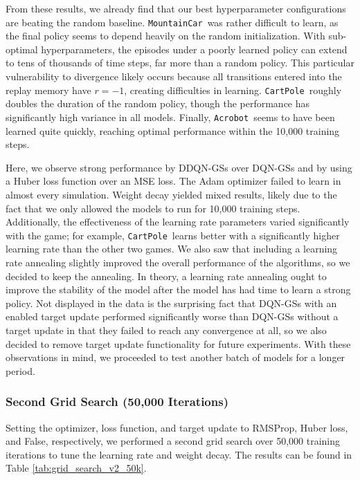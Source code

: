 \documentclass[11pt]{article}
\newcommand{\cp}{\texttt{CartPole}}
\newcommand{\ab}{\texttt{Acrobot}}
\newcommand{\mc}{\texttt{MountainCar}}
\begin{document}
From these results, we already find that our best hyperparameter configurations are beating the random baseline. \mc~was rather difficult to learn, as the final policy seems to depend heavily on the random initialization. With sub-optimal hyperparameters, the episodes under a poorly learned policy can extend to tens of thousands of time steps, far more than a random policy. This particular vulnerability to divergence likely occurs because all transitions entered into the replay memory have $r = -1$, creating difficulties in learning. \cp~roughly doubles the duration of the random policy, though the performance has significantly high variance in all models. Finally, \ab~seems to have been learned quite quickly, reaching optimal performance within the 10,000 training steps.

Here, we observe strong performance by DDQN-GSs over DQN-GSs and by using a Huber loss function over an MSE loss. The Adam optimizer failed to learn in almost every simulation. Weight decay yielded mixed results, likely due to the fact that we only allowed the models to run for 10,000 training steps. Additionally, the effectiveness of the learning rate parameters varied significantly with the game; for example, \cp~learns better with a significantly higher learning rate than the other two games. We also saw that including a learning rate annealing slightly improved the overall performance of the algorithms, so we decided to keep the annealing. In theory, a learning rate annealing ought to improve the stability of the model after the model has had time to learn a strong policy. Not displayed in the data is the surprising fact that DQN-GSs with an enabled target update performed significantly worse than DQN-GSs without a target update in that they failed to reach any convergence at all, so we also decided to remove target update functionality for future experiments. With these observations in mind, we proceeded to test another batch of models for a longer period. 

\subsubsection{Second Grid Search (50,000 Iterations)}
 
Setting the optimizer, loss function, and target update to RMSProp, Huber loss, and False, respectively, we performed a second grid search over 50,000 training iterations to tune the learning rate and weight decay. The results can be found in Table \ref{tab:grid_search_v2_50k}.
\end{document}
